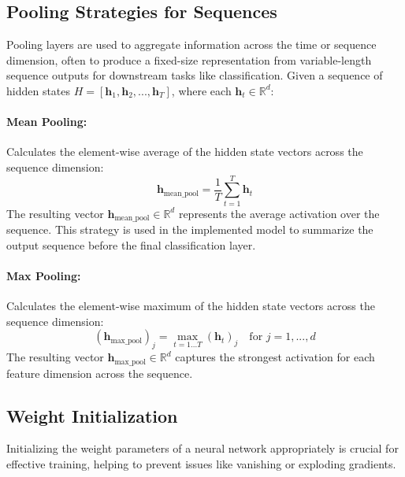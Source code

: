 \subsection{Pooling Strategies for Sequences}
Pooling layers are used to aggregate information across the time or sequence dimension, often to produce a fixed-size representation from variable-length sequence outputs for downstream tasks like classification. Given a sequence of hidden states \( H = [\bm{h}_1, \bm{h}_2, ..., \bm{h}_T] \), where each \( \bm{h}_t \in \mathbb{R}^d \):

\paragraph{Mean Pooling:}
Calculates the element-wise average of the hidden state vectors across the sequence dimension:
\begin{equation}
  \bm{h}_{\text{mean\_pool}} = \frac{1}{T} \sum_{t=1}^T \bm{h}_t
\end{equation}
The resulting vector \( \bm{h}_{\text{mean\_pool}} \in \mathbb{R}^d \) represents the average activation over the sequence. This strategy is used in the implemented model to summarize the output sequence before the final classification layer.

\paragraph{Max Pooling:}
Calculates the element-wise maximum of the hidden state vectors across the sequence dimension:
\begin{equation}
  (\bm{h}_{\text{max\_pool}})_j = \max_{t=1...T} (\bm{h}_t)_j \quad \text{for } j = 1, ..., d
\end{equation}
The resulting vector \( \bm{h}_{\text{max\_pool}} \in \mathbb{R}^d \) captures the strongest activation for each feature dimension across the sequence.

\subsection{Weight Initialization}
Initializing the weight parameters of a neural network appropriately is crucial for effective training, helping to prevent issues like vanishing or exploding gradients.

